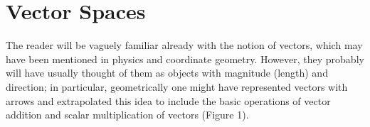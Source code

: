 \section{Vector Spaces}
The reader will be vaguely familiar already with the notion of vectors, which may have been mentioned in physics and coordinate geometry. However, they probably will have usually thought of them as objects with magnitude (length) and direction; in particular, geometrically one might have represented vectors with arrows and extrapolated this idea to include the basic operations of vector addition and scalar multiplication of vectors (Figure 1).
\\\\
